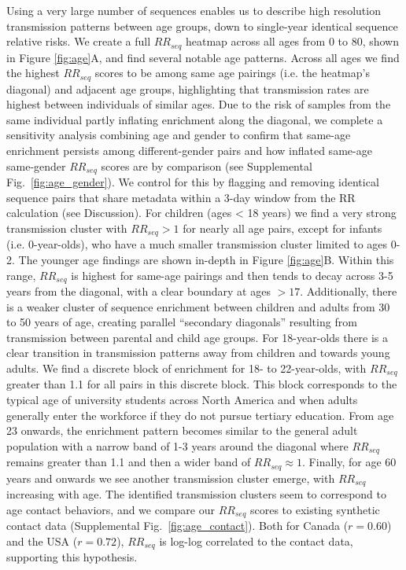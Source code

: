 \documentclass[11pt, letterpaper, oneside]{article}
\begin{document}
Using a very large number of sequences enables us to describe high resolution transmission patterns between age groups, down to single-year identical sequence relative risks.
We create a full $RR_{seq}$ heatmap across all ages from 0 to 80, shown in Figure \ref{fig:age}A, and find several notable age patterns.
Across all ages we find the highest $RR_{seq}$ scores to be among same age pairings (i.e. the heatmap's diagonal) and adjacent age groups, highlighting that transmission rates are highest between individuals of similar ages.
Due to the risk of samples from the same individual partly inflating enrichment along the diagonal, we complete a sensitivity analysis combining age and gender to confirm that same-age enrichment persists among different-gender pairs and how inflated same-age same-gender $RR_{seq}$ scores are by comparison (see Supplemental Fig.\ \ref{fig:age_gender}).
We control for this by flagging and removing identical sequence pairs that share metadata within a 3-day window from the RR calculation (see Discussion).
For children (ages < 18 years) we find a very strong transmission cluster with $RR_{seq} > 1$ for nearly all age pairs, except for infants (i.e. 0-year-olds), who have a much smaller transmission cluster limited to ages 0-2.
The younger age findings are shown in-depth in Figure \ref{fig:age}B.
Within this range, $RR_{seq}$ is highest for same-age pairings and then tends to decay across 3-5 years from the diagonal, with a clear boundary at ages $> 17$.
Additionally, there is a weaker cluster of sequence enrichment between children and adults from 30 to 50 years of age, creating parallel ``secondary diagonals'' resulting from transmission between parental and child age groups.
For 18-year-olds there is a clear transition in transmission patterns away from children and towards young adults.
We find a discrete block of enrichment for 18- to 22-year-olds, with $RR_{seq}$ greater than 1.1 for all pairs in this discrete block.
This block corresponds to the typical age of university students across North America and when adults generally enter the workforce if they do not pursue tertiary education.
From age 23 onwards, the enrichment pattern becomes similar to the general adult population with a narrow band of 1-3 years around the diagonal where $RR_{seq}$ remains greater than 1.1 and then a wider band of $RR_{seq} \approx 1$.
Finally, for age 60 years and onwards we see another transmission cluster emerge, with $RR_{seq}$ increasing with age.
The identified transmission clusters seem to correspond to age contact behaviors, and we compare our $RR_{seq}$ scores to existing synthetic contact data (Supplemental Fig.\ \ref{fig:age_contact}).\autocite{mistryInferringHighresolutionHuman2021}
Both for Canada ($r=0.60$) and the USA ($r=0.72$), $RR_{seq}$ is log-log correlated to the contact data, supporting this hypothesis.
\end{document}
